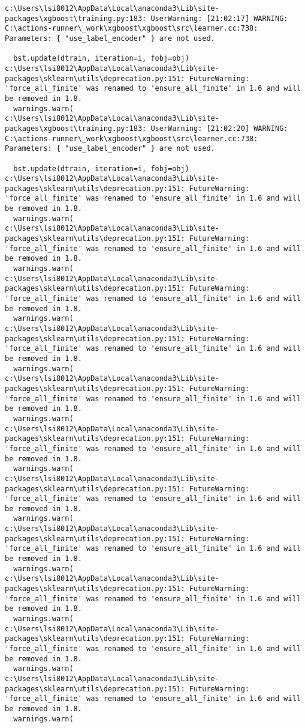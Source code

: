 \documentclass[
  letterpaper,
  DIV=11,
  numbers=noendperiod]{scrreprt}
\begin{document}
\begin{verbatim}
c:\Users\lsi8012\AppData\Local\anaconda3\Lib\site-packages\xgboost\training.py:183: UserWarning: [21:02:17] WARNING: C:\actions-runner\_work\xgboost\xgboost\src\learner.cc:738: 
Parameters: { "use_label_encoder" } are not used.

  bst.update(dtrain, iteration=i, fobj=obj)
c:\Users\lsi8012\AppData\Local\anaconda3\Lib\site-packages\sklearn\utils\deprecation.py:151: FutureWarning: 'force_all_finite' was renamed to 'ensure_all_finite' in 1.6 and will be removed in 1.8.
  warnings.warn(
c:\Users\lsi8012\AppData\Local\anaconda3\Lib\site-packages\xgboost\training.py:183: UserWarning: [21:02:20] WARNING: C:\actions-runner\_work\xgboost\xgboost\src\learner.cc:738: 
Parameters: { "use_label_encoder" } are not used.

  bst.update(dtrain, iteration=i, fobj=obj)
c:\Users\lsi8012\AppData\Local\anaconda3\Lib\site-packages\sklearn\utils\deprecation.py:151: FutureWarning: 'force_all_finite' was renamed to 'ensure_all_finite' in 1.6 and will be removed in 1.8.
  warnings.warn(
c:\Users\lsi8012\AppData\Local\anaconda3\Lib\site-packages\sklearn\utils\deprecation.py:151: FutureWarning: 'force_all_finite' was renamed to 'ensure_all_finite' in 1.6 and will be removed in 1.8.
  warnings.warn(
c:\Users\lsi8012\AppData\Local\anaconda3\Lib\site-packages\sklearn\utils\deprecation.py:151: FutureWarning: 'force_all_finite' was renamed to 'ensure_all_finite' in 1.6 and will be removed in 1.8.
  warnings.warn(
c:\Users\lsi8012\AppData\Local\anaconda3\Lib\site-packages\sklearn\utils\deprecation.py:151: FutureWarning: 'force_all_finite' was renamed to 'ensure_all_finite' in 1.6 and will be removed in 1.8.
  warnings.warn(
c:\Users\lsi8012\AppData\Local\anaconda3\Lib\site-packages\sklearn\utils\deprecation.py:151: FutureWarning: 'force_all_finite' was renamed to 'ensure_all_finite' in 1.6 and will be removed in 1.8.
  warnings.warn(
c:\Users\lsi8012\AppData\Local\anaconda3\Lib\site-packages\sklearn\utils\deprecation.py:151: FutureWarning: 'force_all_finite' was renamed to 'ensure_all_finite' in 1.6 and will be removed in 1.8.
  warnings.warn(
c:\Users\lsi8012\AppData\Local\anaconda3\Lib\site-packages\sklearn\utils\deprecation.py:151: FutureWarning: 'force_all_finite' was renamed to 'ensure_all_finite' in 1.6 and will be removed in 1.8.
  warnings.warn(
c:\Users\lsi8012\AppData\Local\anaconda3\Lib\site-packages\sklearn\utils\deprecation.py:151: FutureWarning: 'force_all_finite' was renamed to 'ensure_all_finite' in 1.6 and will be removed in 1.8.
  warnings.warn(
c:\Users\lsi8012\AppData\Local\anaconda3\Lib\site-packages\sklearn\utils\deprecation.py:151: FutureWarning: 'force_all_finite' was renamed to 'ensure_all_finite' in 1.6 and will be removed in 1.8.
  warnings.warn(
c:\Users\lsi8012\AppData\Local\anaconda3\Lib\site-packages\sklearn\utils\deprecation.py:151: FutureWarning: 'force_all_finite' was renamed to 'ensure_all_finite' in 1.6 and will be removed in 1.8.
  warnings.warn(
c:\Users\lsi8012\AppData\Local\anaconda3\Lib\site-packages\sklearn\utils\deprecation.py:151: FutureWarning: 'force_all_finite' was renamed to 'ensure_all_finite' in 1.6 and will be removed in 1.8.
  warnings.warn(
\end{verbatim}
\end{document}
